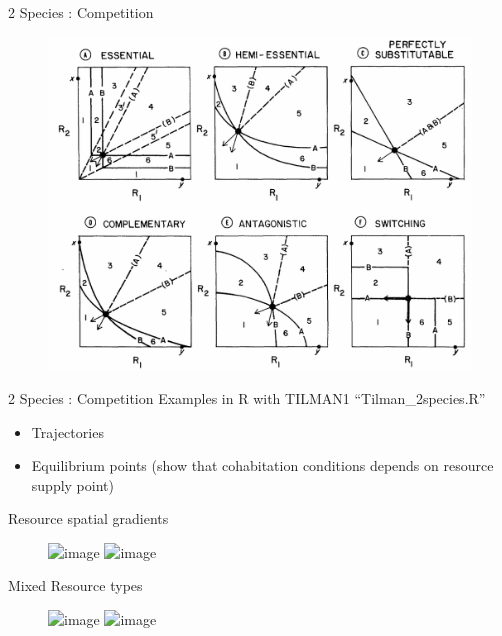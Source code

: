 \documentclass[final,xcolor=dvipsnames]{beamer}
\begin{document}
\begin{frame}{2 Species : Competition}  
\begin{figure}
       \includegraphics[width=.8\framewidth]{Eq6types}
    \end{figure}
\end{frame}

\begin{frame}{2 Species : Competition}  
Examples in R with TILMAN1 ``Tilman\_2species.R''
\begin{itemize}
\item Trajectories
\item Equilibrium points (show that cohabitation conditions depends on resource supply point)
\end{itemize}
\end{frame}



\begin{frame}{Resource spatial gradients}
\begin{figure}
       \includegraphics<1>[width=.8\framewidth]{Eq6typesB}
       \includegraphics<2>[width=.8\framewidth]{RessourceGradients1}
    \end{figure}
\end{frame}

\begin{frame}{Mixed Resource types}
\begin{figure}
       \includegraphics<1>[width=.6\framewidth]{Mixed1}
       \includegraphics<2>[width=.6\framewidth]{RessourceGradients2}
    \end{figure}
\end{frame}
\end{document}
